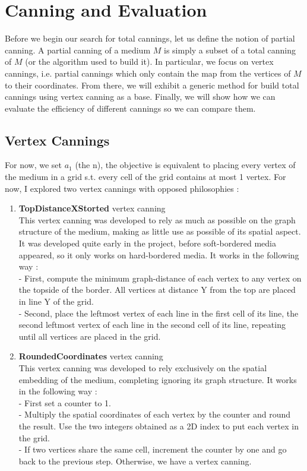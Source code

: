 \documentclass{article}
\begin{document}
\section{Canning and Evaluation}

Before we begin our search for total cannings, let us define the notion of partial canning. A partial canning of a medium $M$ is simply a subset of a total canning of $M$ (or the algorithm used to build it). In particular, we focus on vertex cannings, i.e. partial cannings which only contain the map from the vertices of $M$ to their coordinates. From there, we will exhibit a generic method for build total cannings using vertex canning as a base. Finally, we will show how we can evaluate the efficiency of different cannings so we can compare them.

\subsection{Vertex Cannings}
\label{partial_canning}

For now, we set $a_1$ (the n), the objective is equivalent to placing every vertex of the medium in a grid s.t. every cell of the grid contains at most 1 vertex. For now, I explored two vertex cannings with opposed philosophies :
\begin{enumerate}
	\item \textbf{TopDistanceXStorted} vertex canning\\
	This vertex canning was developed to rely as much as possible on the graph structure of the medium, making as little use as possible of its spatial aspect. It was developed quite early in the project, before soft-bordered media appeared, so it only works on hard-bordered media. It works in the following way :\\
	- First, compute the minimum graph-distance of each vertex to any vertex on the topside of the border. All vertices at distance Y from the top are placed in line Y of the grid.\\
	- Second, place the leftmost vertex of each line in the first cell of its line, the second leftmost vertex of each line in the second cell of its line, repeating until all vertices are placed in the grid.
	
	\item \textbf{RoundedCoordinates} vertex canning\\
	This vertex canning was developed to rely exclusively on the spatial embedding of the medium, completing ignoring its graph structure. It works in the following way :\\
	- First set a counter to 1.\\
	- Multiply the spatial coordinates of each vertex by the counter and round the result. Use the two integers obtained as a 2D index to put each vertex in the grid.\\
	- If two vertices share the same cell, increment the counter by one and go back to the previous step. Otherwise, we have a vertex canning.
\end{enumerate}
\end{document}
